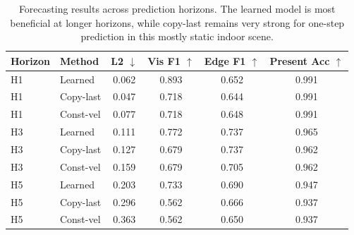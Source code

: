\begin{table}[t]
\centering
\caption{Forecasting results across prediction horizons. The learned model is most beneficial at longer horizons, while copy-last remains very strong for one-step prediction in this mostly static indoor scene.}
\small
\begin{tabular}{llcccc}
\toprule
Horizon & Method & L2 $\downarrow$ & Vis F1 $\uparrow$ & Edge F1 $\uparrow$ & Present Acc $\uparrow$ \\
\midrule
H1 & Learned & 0.062 & 0.893 & 0.652 & 0.991 \\
H1 & Copy-last & 0.047 & 0.718 & 0.644 & 0.991 \\
H1 & Const-vel & 0.077 & 0.718 & 0.648 & 0.991 \\
H3 & Learned & 0.111 & 0.772 & 0.737 & 0.965 \\
H3 & Copy-last & 0.127 & 0.679 & 0.737 & 0.962 \\
H3 & Const-vel & 0.159 & 0.679 & 0.705 & 0.962 \\
H5 & Learned & 0.203 & 0.733 & 0.690 & 0.947 \\
H5 & Copy-last & 0.296 & 0.562 & 0.666 & 0.937 \\
H5 & Const-vel & 0.363 & 0.562 & 0.650 & 0.937 \\
\bottomrule
\end{tabular}
\end{table}